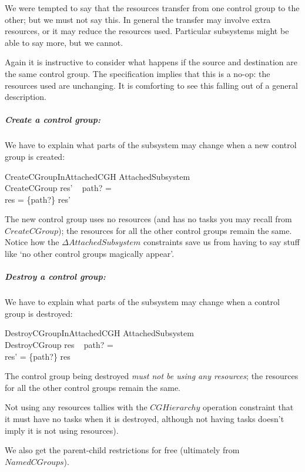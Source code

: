 \documentclass[a4paper,twoside,12pt]{article}
\begin{document}
We were tempted to say that the resources transfer from one control group to the other; but we must not say this.
In general the transfer may involve extra resources, or it may reduce the resources used. Particular
subsystems might be able to say more, but we cannot.

Again it is instructive to consider what happens if the source and destination are the same control group. 
The specification implies that this is a no-op: the resources used are unchanging. 
It is comforting to see this falling out of a general description.

\subparagraph{Create a control group:}
We have to explain what parts of the subsystem may change when a new control group is created:

\begin{schema}{CreateCGroupInAttachedCGH}
\Delta AttachedSubsystem \\
CreateCGroup
\where
res' ~ path? = \emptyset \\
res = \{path?\} \ndres res'
\end{schema}
The new control group uses no resources (and has no tasks you may recall from $CreateCGroup$); the resources
for all the other control groups remain the same. Notice how the $\Delta AttachedSubsystem$ constraints save us
from having to say stuff like `no other control groups magically appear'.

\subparagraph{Destroy a control group:}
We have to explain what parts of the subsystem may change when a control group is destroyed:

\begin{schema}{DestroyCGroupInAttachedCGH}
\Delta AttachedSubsystem \\
DestroyCGroup
\where
res ~ path? = \emptyset \\
res' = \{path?\} \ndres res
\end{schema}
The control group being destroyed \emph{must not be using any resources};
the resources for all the other control groups remain
the same.

Not using any resources tallies with the $CGHierarchy$ operation constraint that it must have no tasks when it is
destroyed, although not having tasks doesn't imply it is not using resources).

We also get the parent-child restrictions for free (ultimately from $NamedCGroups$).
\end{document}
